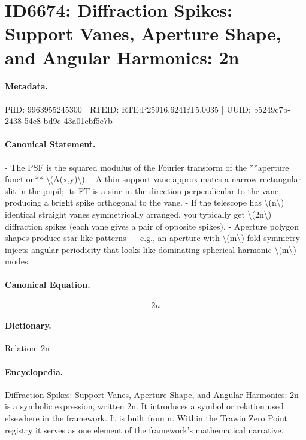 \section*{ID6674: Diffraction Spikes: Support Vanes, Aperture Shape, and Angular Harmonics: 2n}
\paragraph{Metadata.}
PiID: 9963955245300 | RTEID: RTE:P25916.6241:T5.0035 | UUID: b5249c7b-2438-54c8-bd9c-43a01ebf5e7b

\paragraph{Canonical Statement.}
- The PSF is the squared modulus of the Fourier transform of the **aperture function** \textbackslash{}(A(x,y)\textbackslash{}). - A thin support vane approximates a narrow rectangular slit in the pupil; its FT is a sinc in the direction perpendicular to the vane, producing a bright spike orthogonal to the vane. - If the telescope has \textbackslash{}(n\textbackslash{}) identical straight vanes symmetrically arranged, you typically get \textbackslash{}(2n\textbackslash{}) diffraction spikes (each vane gives a pair of opposite spikes). - Aperture polygon shapes produce star-like patterns — e.g., an aperture with \textbackslash{}(m\textbackslash{})-fold symmetry injects angular periodicity that looks like dominating spherical-harmonic \textbackslash{}(m\textbackslash{})-modes.

\paragraph{Canonical Equation.}
\[
2n
\]

\paragraph{Dictionary.}
Relation: 2n

\paragraph{Encyclopedia.}
Diffraction Spikes: Support Vanes, Aperture Shape, and Angular Harmonics: 2n is a symbolic expression, written 2n. It introduces a symbol or relation used elsewhere in the framework. It is built from n. Within the Trawin Zero Point registry it serves as one element of the framework's mathematical narrative.

